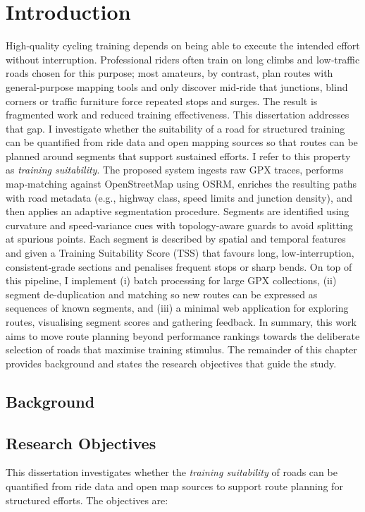 \documentclass[11pt,twoside]{report}
\begin{document}
\clearpage
\hypersetup{pageanchor=true}


\chapter{Introduction}
\label{chap:introduction}
High‑quality cycling training depends on being able to execute the intended effort without interruption. Professional riders often train on long climbs and low‑traffic roads chosen for this purpose; most amateurs, by contrast, plan routes with general‑purpose mapping tools and only discover mid‑ride that junctions, blind corners or traffic furniture force repeated stops and surges. The result is fragmented work and reduced training effectiveness.
This dissertation addresses that gap. I investigate whether the suitability of a road for structured training can be quantified from ride data and open mapping sources so that routes can be planned around segments that support sustained efforts. I refer to this property as \emph{training suitability}.
The proposed system ingests raw GPX traces, performs map‑matching against OpenStreetMap using OSRM, enriches the resulting paths with road metadata (e.g., highway class, speed limits and junction density), and then applies an adaptive segmentation procedure. Segments are identified using curvature and speed‑variance cues with topology‑aware guards to avoid splitting at spurious points. Each segment is described by spatial and temporal features and given a Training Suitability Score (TSS) that favours long, low‑interruption, consistent‑grade sections and penalises frequent stops or sharp bends.
On top of this pipeline, I implement (i) batch processing for large GPX collections, (ii) segment de‑duplication and matching so new routes can be expressed as sequences of known segments, and (iii) a minimal web application for exploring routes, visualising segment scores and gathering feedback.
In summary, this work aims to move route planning beyond performance rankings towards the deliberate selection of roads that maximise training stimulus. The remainder of this chapter provides background and states the research objectives that guide the study.
\section{Background}


\section{Research Objectives}
\label{sec:research-objectives}
This dissertation investigates whether the \emph{training suitability} of roads can be quantified from ride data and open map sources to support route planning for structured efforts. The objectives are:
\end{document}

